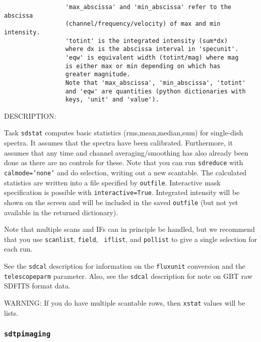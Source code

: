 \begin{verbatim}
                 'max_abscissa' and 'min_abscissa' refer to the abscissa
                 (channel/frequency/velocity) of max and min intensity.
                 'totint' is the integrated intensity (sum*dx)
                 where dx is the abscissa interval in 'specunit'.
                 'eqw' is equivalent width (totint/mag) where mag
                 is either max or min depending on which has
                 greater magnitude. 
                 Note that 'max_abscissa', 'min_abscissa', 'totint' 
                 and 'eqw' are quantities (python dictionaries with
                 keys, 'unit' and 'value').

\end{verbatim}

DESCRIPTION: 

Task {\tt sdstat} computes basic statistics (rms,mean,median,sum)
for single-dish spectra.  It assumes that the spectra have
been calibrated.  Furthermore, it assumes that any
time and channel averaging/smoothing has also already been done as
there are no controls for these. Note that you can run {\tt sdreduce}
with {\tt calmode='none'} and do selection, writing out a new
scantable.
The calculated statistics are written into a file specified by
{\tt outfile}.
Interactive mask specification is possible with {\tt interactive=True}.
Integrated intensity will be shown on the screen and will be included
in the saved {\tt outfile} (but not yet available in the returned dictionary).

Note that multiple scans and IFs can in principle be handled, but
we recommend that you use {\tt scanlist}, {\tt field}, {\tt
iflist}, and {\tt pollist} to give a single selection for each run.

See the {\tt sdcal} description for information on the {\tt fluxunit} 
conversion and the {\tt telescopeparm} parameter.
Also, see the {\tt sdcal} description for note on GBT raw SDFITS format data.

WARNING: If you do have multiple scantable rows, then {\tt xstat}
values will be lists.


\subsubsection{{\tt sdtpimaging}}
\label{section:sd.sdtasks.tasks.sdtpimaging}

